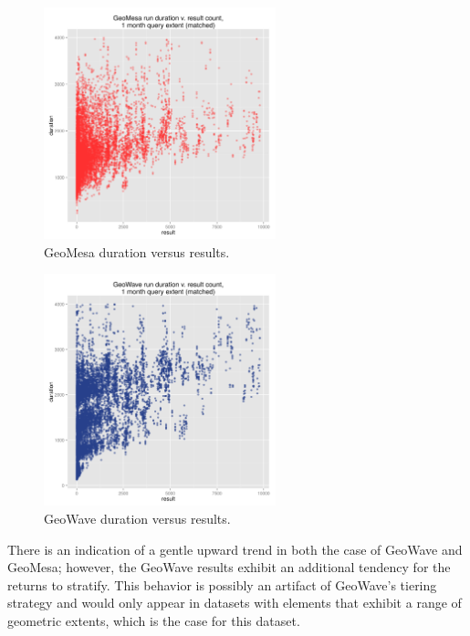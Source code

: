\begin{figure}[h!tb]
  \centering
  \includegraphics[width=0.60\textwidth]{../docs/img/tracks/GM_duration_v_result_matched_1month.png}
  \caption{GeoMesa duration versus results.}
  \label{tracksgm}
\end{figure}

\begin{figure}[h!tb]
  \centering
  \includegraphics[width=0.60\textwidth]{../docs/img/tracks/GW_duration_v_result_matched_1month.png}
  \caption{GeoWave duration versus results.}
  \label{tracksgw}
\end{figure}

There is an indication of a gentle upward trend in both the case of GeoWave and GeoMesa;
however, the GeoWave results exhibit an additional tendency for the returns to stratify.
This behavior is possibly an artifact of GeoWave's tiering strategy and would only appear in datasets with elements that exhibit a range of geometric extents,
which is the case for this dataset.

